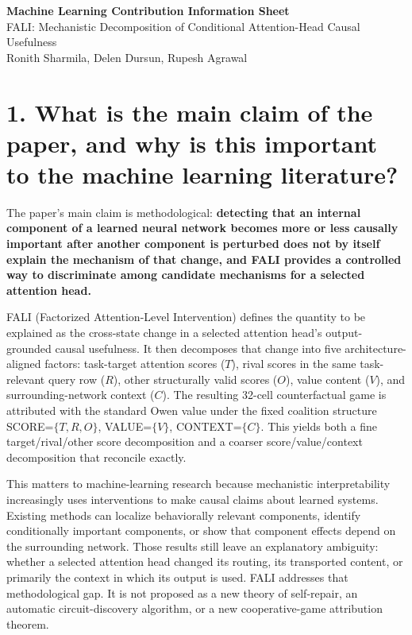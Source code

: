 \documentclass[10pt]{article}
\begin{document}
\setlength{\parskip}{0.25em}
\setlength{\parindent}{0pt}

\begin{center}
{\Large\bfseries Machine Learning Contribution Information Sheet}\\[0.5em]
{\large FALI: Mechanistic Decomposition of Conditional Attention-Head Causal Usefulness}\\[0.35em]
{\normalsize Ronith Sharmila, Delen Dursun, Rupesh Agrawal}
\end{center}
\vspace{0.6em}


\section*{1. What is the main claim of the paper, and why is this important to the machine learning literature?}

The paper's main claim is methodological: \textbf{detecting that an internal component of a learned neural network becomes more or less causally important after another component is perturbed does not by itself explain the mechanism of that change, and FALI provides a controlled way to discriminate among candidate mechanisms for a selected attention head.}

FALI (Factorized Attention-Level Intervention) defines the quantity to be explained as the cross-state change in a selected attention head's output-grounded causal usefulness. It then decomposes that change into five architecture-aligned factors: task-target attention scores ($T$), rival scores in the same task-relevant query row ($R$), other structurally valid scores ($O$), value content ($V$), and surrounding-network context ($C$). The resulting 32-cell counterfactual game is attributed with the standard Owen value under the fixed coalition structure SCORE=$\{T,R,O\}$, VALUE=$\{V\}$, CONTEXT=$\{C\}$. This yields both a fine target/rival/other score decomposition and a coarser score/value/context decomposition that reconcile exactly.

This matters to machine-learning research because mechanistic interpretability increasingly uses interventions to make causal claims about learned systems. Existing methods can localize behaviorally relevant components, identify conditionally important components, or show that component effects depend on the surrounding network. Those results still leave an explanatory ambiguity: whether a selected attention head changed its routing, its transported content, or primarily the context in which its output is used. FALI addresses that methodological gap. It is not proposed as a new theory of self-repair, an automatic circuit-discovery algorithm, or a new cooperative-game attribution theorem.
\end{document}
